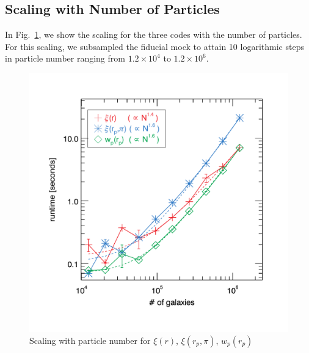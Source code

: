 \documentclass[12pt,titlepage,justified]{article}
\newcommand{\xir}{\ensuremath{{\xi(r)}}\xspace}
\newcommand{\wprp}{\ensuremath{{w_p(r_p)}}\xspace}
\newcommand{\xirppi}{\ensuremath{{\xi(r_p,\pi)}}\xspace}
\begin{document}
\subsection{Scaling with Number of Particles}
In Fig.~\ref{fig:scaling_numpart}, we show the scaling for the three codes with the number of particles. For this scaling, we subsampled 
the fiducial mock to attain 10 logarithmic steps in particle number ranging from $1.2\times10^4$ to $1.2\times10^6$. 

\begin{figure}[htbp]
\includegraphics[clip=true,width=\linewidth]{timings_Mr19_numpart}%
\caption{Scaling with particle number for \xir, \xirppi, \wprp }
\label{fig:scaling_numpart}
\end{figure}
\end{document}
